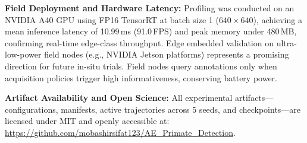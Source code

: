 \documentclass[conference]{IEEEtran}
\newif\ifanonymous
\begin{document}
\noindent\textbf{Field Deployment and Hardware Latency:} Profiling was conducted on an NVIDIA A40 GPU using FP16 TensorRT at batch size 1 ($640 \times 640$), achieving a mean inference latency of 10.99\,ms (91.0\,FPS) and peak memory under 480\,MB, confirming real-time edge-class throughput. Edge embedded validation on ultra-low-power field nodes (e.g., NVIDIA Jetson platforms) represents a promising direction for future in-situ trials. Field nodes query annotations only when acquisition policies trigger high informativeness, conserving battery power.

\noindent\textbf{Artifact Availability and Open Science:} All experimental artifacts---configurations, manifests, active trajectories across 5 seeds, and checkpoints---are licensed under MIT and openly accessible at: \ifanonymous \url{https://anonymous.4open.science/r/AE_Primate_Detection-anon}\else \url{https://github.com/mobashirsifat123/AE_Primate_Detection}\fi.
\end{document}
